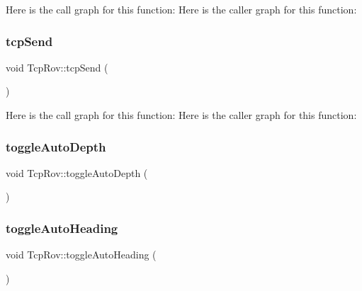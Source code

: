 Here is the call graph for this function\+:
Here is the caller graph for this function\+:
\mbox{\label{class_tcp_rov_ab04514769f70093b687558d09716ae5c}} 
\subsubsection{\texorpdfstring{tcp\+Send}{tcpSend}}
{\footnotesize\ttfamily void Tcp\+Rov\+::tcp\+Send (\begin{DoxyParamCaption}{ }\end{DoxyParamCaption})\hspace{0.3cm}{\ttfamily [slot]}}

Here is the call graph for this function\+:
Here is the caller graph for this function\+:
\mbox{\label{class_tcp_rov_acaef32df08c8e1c6ea6760b5e9dcd51b}} 
\subsubsection{\texorpdfstring{toggle\+Auto\+Depth}{toggleAutoDepth}}
{\footnotesize\ttfamily void Tcp\+Rov\+::toggle\+Auto\+Depth (\begin{DoxyParamCaption}{ }\end{DoxyParamCaption})\hspace{0.3cm}{\ttfamily [slot]}}

\mbox{\label{class_tcp_rov_a5d93e60de71cced318526e3a26274c21}} 
\subsubsection{\texorpdfstring{toggle\+Auto\+Heading}{toggleAutoHeading}}
{\footnotesize\ttfamily void Tcp\+Rov\+::toggle\+Auto\+Heading (\begin{DoxyParamCaption}{ }\end{DoxyParamCaption})\hspace{0.3cm}{\ttfamily [slot]}}

\mbox{\label{class_tcp_rov_acd0dd0bc4120b971aada9453edfea572}} 
